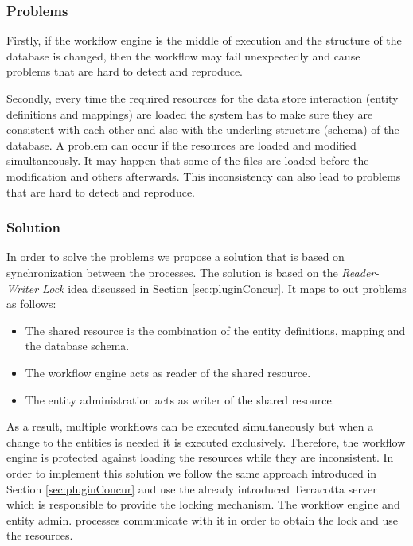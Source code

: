 \subsubsection{Problems}
Firstly, if the workflow engine is the middle of execution and the structure of the database is changed, then the workflow may fail unexpectedly and cause problems that are hard to detect and reproduce. 

Secondly, every time the required resources for the data store interaction (entity definitions and mappings) are loaded the system has to make sure they are consistent with each other and also with the underling structure (schema) of the database. A problem can occur if the resources are loaded and modified simultaneously. It may happen that some of the files are loaded before the modification and others afterwards. This inconsistency can also lead to problems that are hard to detect and reproduce.

\subsubsection{Solution}

In order to solve the problems we propose a solution that is based on synchronization between the processes. The solution is based on the \textit{Reader-Writer Lock} idea \cite{lev2009scalable} discussed in Section \ref{sec:pluginConcur}. It maps to out problems as follows:

\begin{itemize}
	\item The shared resource is the combination of the entity definitions, mapping and the database schema.
	\item The workflow engine acts as reader of the shared resource.
	\item The entity administration acts as writer of the shared resource.
\end{itemize}

As a result, multiple workflows can be executed simultaneously but when a change to the entities is needed it is executed exclusively. Therefore, the workflow engine is protected against loading the resources while they are inconsistent. In order to implement this solution we follow the same approach introduced in Section \ref{sec:pluginConcur} and use the already introduced Terracotta server which is responsible to provide the locking mechanism. The workflow engine and entity admin. processes communicate with it in order to obtain the lock and use the resources.

